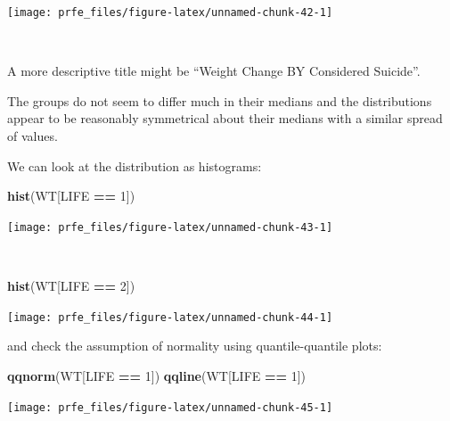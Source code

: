 \documentclass[12pt,a4paper]{book}
\newenvironment{Shaded}{\begin{snugshade}}{\end{snugshade}}
\newcommand{\KeywordTok}[1]{\textcolor[rgb]{0.13,0.29,0.53}{\textbf{#1}}}
\newcommand{\DecValTok}[1]{\textcolor[rgb]{0.00,0.00,0.81}{#1}}
\newcommand{\StringTok}[1]{\textcolor[rgb]{0.31,0.60,0.02}{#1}}
\newcommand{\OperatorTok}[1]{\textcolor[rgb]{0.81,0.36,0.00}{\textbf{#1}}}
\newcommand{\NormalTok}[1]{#1}
\theoremstyle{definition}
\theoremstyle{definition}
\theoremstyle{definition}
\theoremstyle{remark}
\begin{document}
\begin{center}\texttt{[image: prfe\_files/figure-latex/unnamed-chunk-42-1]} \end{center}

~

A more descriptive title might be ``Weight Change BY Considered
Suicide''.

The groups do not seem to differ much in their medians and the
distributions appear to be reasonably symmetrical about their medians
with a similar spread of values.

\newpage

We can look at the distribution as histograms:

\begin{Shaded}
\begin{Highlighting}[]
\KeywordTok{hist}\NormalTok{(WT[LIFE }\OperatorTok{==}\StringTok{ }\DecValTok{1}\NormalTok{])}
\end{Highlighting}
\end{Shaded}

\begin{center}\texttt{[image: prfe\_files/figure-latex/unnamed-chunk-43-1]} \end{center}

~

\begin{Shaded}
\begin{Highlighting}[]
\KeywordTok{hist}\NormalTok{(WT[LIFE }\OperatorTok{==}\StringTok{ }\DecValTok{2}\NormalTok{])}
\end{Highlighting}
\end{Shaded}

\begin{center}\texttt{[image: prfe\_files/figure-latex/unnamed-chunk-44-1]} \end{center}

\newpage

and check the assumption of normality using quantile-quantile plots:

\begin{Shaded}
\begin{Highlighting}[]
\KeywordTok{qqnorm}\NormalTok{(WT[LIFE }\OperatorTok{==}\StringTok{ }\DecValTok{1}\NormalTok{])}
\KeywordTok{qqline}\NormalTok{(WT[LIFE }\OperatorTok{==}\StringTok{ }\DecValTok{1}\NormalTok{])}
\end{Highlighting}
\end{Shaded}

\begin{center}\texttt{[image: prfe\_files/figure-latex/unnamed-chunk-45-1]} \end{center}
\end{document}
